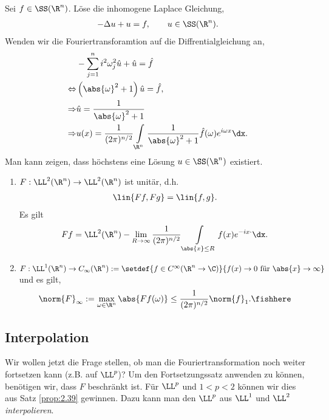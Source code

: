 \begin{bsp}
\label{bsp:2.38}
Sei $f\in\SS(\R^n)$. Löse die inhomogene Laplace Gleichung,
\begin{align*}
-\Delta u + u = f,\qquad u\in\SS(\R^n).
\end{align*}
Wenden wir die Fouriertransforamtion auf die Diffrentialgleichung an,
\begin{align*}
&-\sum\limits_{j=1}^n i^2 \omega_j^2 \hat{u} + \hat{u} = \hat{f}\\
\Leftrightarrow & \left(\abs{\omega}^2 +1\right)\hat{u} =\hat{f},\\
\Rightarrow &\hat{u} = \frac{1}{\abs{\omega}^2 + 1}\\
\Rightarrow &u(x) = \frac{1}{(2\pi)^{n/2}}\int\limits_{\R^n}
\frac{1}{\abs{\omega}^2+1}\hat{f}(\omega) e^{i\omega x}\dx.
\end{align*}
Man kann zeigen, dass höchstens eine Lösung $u\in\SS(\R^n)$ existiert.\bsphere
\end{bsp}

\begin{prop}[Fortsetzung]
\label{prop:2.39}
\begin{enumerate}[label=\arabic{*}.)]
  \item $F: \LL^2(\R^n)\to \LL^2(\R^n)$ ist unitär, d.h.
\begin{align*}
\lin{Ff,Fg} = \lin{f,g}.
\end{align*}
Es gilt
\begin{align*}
Ff = \LL^2(\R^n)-\lim\limits_{R\to\infty}
\frac{1}{(2\pi)^{n/2}}\int\limits_{\abs{x}\le R}f(x)e^{-ix\cdot}\dx.
\end{align*}
\item $F: \LL^1(\R^n)\to C_\infty(\R^n) := \setdef{f\in
C^\infty(\R^n\to\C)}{f(x)\to 0\text{ für }\abs{x}\to\infty}$ und es gilt,
\begin{align*}
\norm{F}_\infty := \max\limits_{\omega\in\R^n}\abs{Ff(\omega)} \le
\frac{1}{(2\pi)^{n/2}}\norm{f}_1.\fishhere
\end{align*}
\end{enumerate}
\end{prop}

\subsection{Interpolation}

Wir wollen jetzt die Frage stellen, ob man die
Fouriertransformation noch weiter fortsetzen kann (z.B. auf $\LL^p$)? Um den
Fortsetzungssatz anwenden zu können, benötigen wir, dass $F$ beschränkt ist. Für
$\LL^p$ und $1<p<2$ können wir dies aus Satz \ref{prop:2.39} gewinnen. Dazu
kann man den $\LL^p$ aus $\LL^1$ und $\LL^2$ \emph{interpolieren}.


